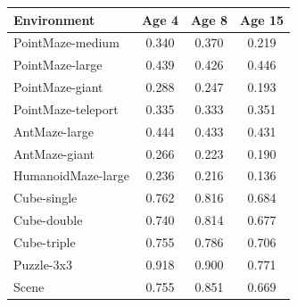 \begin{tabular}{lccc}
\toprule
Environment & Age 4 & Age 8 & Age 15\\
\midrule
PointMaze-medium & 0.340 & 0.370 & 0.219\\
PointMaze-large & 0.439 & 0.426 & 0.446\\
PointMaze-giant & 0.288 & 0.247 & 0.193\\
PointMaze-teleport & 0.335 & 0.333 & 0.351\\
AntMaze-large & 0.444 & 0.433 & 0.431\\
AntMaze-giant & 0.266 & 0.223 & 0.190\\
HumanoidMaze-large & 0.236 & 0.216 & 0.136\\
Cube-single & 0.762 & 0.816 & 0.684\\
Cube-double & 0.740 & 0.814 & 0.677\\
Cube-triple & 0.755 & 0.786 & 0.706\\
Puzzle-3x3 & 0.918 & 0.900 & 0.771\\
Scene & 0.755 & 0.851 & 0.669\\
\bottomrule
\end{tabular}

